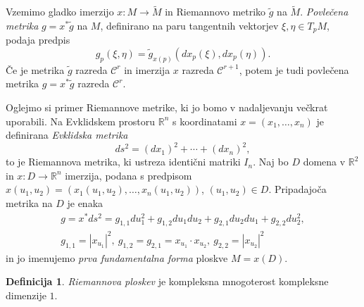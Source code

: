 \documentclass[12pt,a4paper,twoside]{article}
\theoremstyle{definition} %
\newtheorem{definicija}{Definicija}[section]
\theoremstyle{plain} %
\numberwithin{equation}{section}  %
\newcommand{\R}{\mathbb R}
\begin{document}
Vzemimo gladko imerzijo $x \colon M \to \widetilde{M}$ in Riemannovo metriko $\tilde{g}$ na $\widetilde{M}$. \emph{Povlečena metrika} $g = x^{*} \tilde{g}$ na $M$, definirano na paru tangentnih vektorjev $\xi, \eta \in T_{p}M$, podaja predpis
\begin{equation} \label{eq:pullback}
g_{p}(\xi, \eta) = \tilde{g}_{x(p)} (dx_{p}(\xi), dx_{p}(\eta)).
\end{equation}
Če je metrika $\tilde{g}$ razreda $\mathcal{C}^{r}$ in imerzija $x$ razreda $\mathcal{C}^{r+1}$, potem je tudi povlečena metrika $g = x^{*} \tilde{g}$ razreda $\mathcal{C}^{r}$.

Oglejmo si primer Riemannove metrike, ki jo bomo v nadaljevanju večkrat uporabili.
Na Evklidskem prostoru $\R^{n}$ s koordinatami $x = (x_{1}, \dots, x_{n})$ je definirana \emph{Evklidska metrika}
\begin{equation}
ds^2 = (dx_{1})^2 + \cdots + (dx_{n})^2,
\end{equation}
to je Riemannova metrika, ki ustreza identični matriki $I_{n}$. Naj bo $D$ domena v $\R^2$ in $x \colon D \to \R^{n}$ imerzija, podana s predpisom $x(u_1,u_2) = (x_{1}(u_1,u_2), \dots, x_{n}(u_1,u_2))$, $(u_1,u_2) \in D$. Pripadajoča metrika na $D$ je enaka
\begin{gather}
g = x^{*}ds^2 = g_{1,1}du_{1}^2 + g_{1,2}du_{1}du_{2} + g_{2,1}du_{2}du_{1} + g_{2,2}du_{2}^2, \\
g_{1,1} = |x_{u_1}|^2, \ g_{1,2} = g_{2,1} = x_{u_1} \cdot x_{u_2}, \ g_{2,2} = |x_{u_2}|^2
\end{gather}
in jo imenujemo \emph{prva fundamentalna forma} ploskve $M = x(D)$.

\begin{definicija}
\emph{Riemannova ploskev} je kompleksna mnogoterost kompleksne dimenzije $1$.
\end{definicija}

\end{document}
